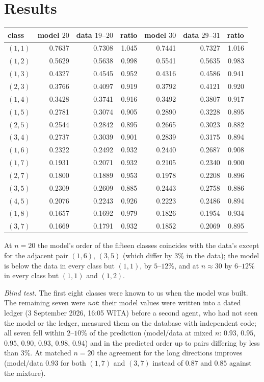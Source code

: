 \documentclass[11pt,a4paper]{article}
\begin{document}
\section{Results}
\begin{center}\begin{tabular}{lrrrrrr}\toprule
class & model $20$ & data $19$--$20$ & ratio & model $30$ & data $29$--$31$ & ratio\\\midrule
$(1,1)$ & 0.7637 & 0.7308 & 1.045 & 0.7441 & 0.7327 & 1.016\\
$(1,2)$ & 0.5629 & 0.5638 & 0.998 & 0.5541 & 0.5635 & 0.983\\
$(1,3)$ & 0.4327 & 0.4545 & 0.952 & 0.4316 & 0.4586 & 0.941\\
$(2,3)$ & 0.3766 & 0.4097 & 0.919 & 0.3792 & 0.4121 & 0.920\\
$(1,4)$ & 0.3428 & 0.3741 & 0.916 & 0.3492 & 0.3807 & 0.917\\
$(1,5)$ & 0.2781 & 0.3074 & 0.905 & 0.2890 & 0.3228 & 0.895\\
$(2,5)$ & 0.2544 & 0.2842 & 0.895 & 0.2665 & 0.3023 & 0.882\\
$(3,4)$ & 0.2737 & 0.3039 & 0.901 & 0.2839 & 0.3175 & 0.894\\
$(1,6)$ & 0.2322 & 0.2492 & 0.932 & 0.2440 & 0.2687 & 0.908\\
$(1,7)$ & 0.1931 & 0.2071 & 0.932 & 0.2105 & 0.2340 & 0.900\\
$(2,7)$ & 0.1800 & 0.1889 & 0.953 & 0.1978 & 0.2208 & 0.896\\
$(3,5)$ & 0.2309 & 0.2609 & 0.885 & 0.2443 & 0.2758 & 0.886\\
$(4,5)$ & 0.2076 & 0.2243 & 0.926 & 0.2223 & 0.2486 & 0.894\\
$(1,8)$ & 0.1657 & 0.1692 & 0.979 & 0.1826 & 0.1954 & 0.934\\
$(3,7)$ & 0.1669 & 0.1791 & 0.932 & 0.1852 & 0.2069 & 0.895\\
\bottomrule\end{tabular}\end{center}
At $n=20$ the model's order of the fifteen classes coincides with the data's except for the adjacent pair $(1,6)$, $(3,5)$
(which differ by $3\%$ in the data); the model is below the data in every class but $(1,1)$, by $5$--$12\%$, and at
$n\approx30$ by $6$--$12\%$ in every class but $(1,1)$ and $(1,2)$.

\emph{Blind test.}  The first eight classes were known to us when the model was built.  The remaining seven were
\emph{not}: their model values were written into a dated ledger (3 September 2026, 16:05 WITA) before a second agent,
who had not seen the model or the ledger, measured them on the database with independent code; all seven fell within
$2$--$10\%$ of the prediction (model$/$data at mixed $n$: $0.93$, $0.95$, $0.95$, $0.90$, $0.93$, $0.98$, $0.94$)
and in the predicted order up to pairs differing by less than $3\%$.  At matched $n=20$ the agreement for the long
directions improves (model$/$data $0.93$ for both $(1,7)$ and $(3,7)$ instead of $0.87$ and $0.85$ against the mixture).
\end{document}
